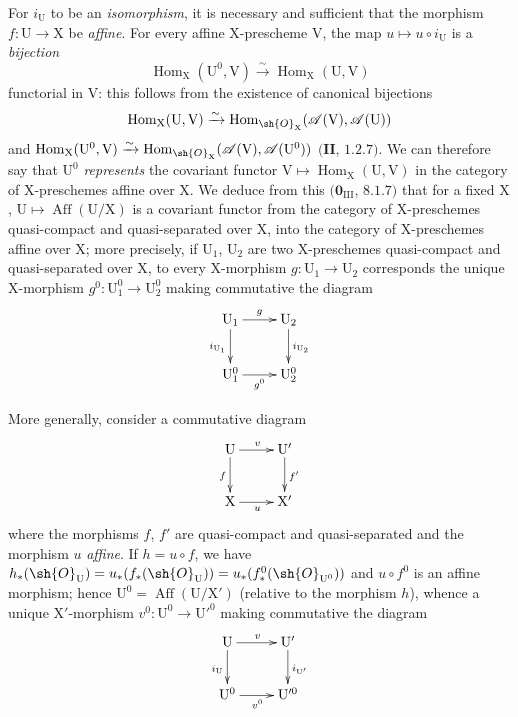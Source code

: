 \begin{env}[21.12.1]
For $i_{\mathrm{U}}$ to be an \emph{isomorphism}, it is necessary and sufficient that the morphism $f:\mathrm{U}\to\mathrm{X}$ be \emph{affine}.
For every affine $\mathrm{X}$-prescheme $\mathrm{V}$, the map $u\mapsto u\circ i_{\mathrm{U}}$ is a \emph{bijection}
\[
  \operatorname{Hom}_{\mathrm{X}}(\mathrm{U}^0,\mathrm{V})\xrightarrow{\sim}\operatorname{Hom}_{\mathrm{X}}(\mathrm{U},\mathrm{V})
\]
functorial in $\mathrm{V}$: this follows from the existence of canonical bijections
\[
  \operatorname{Hom}_{\mathrm{X}}(\mathrm{U},\mathrm{V})\xrightarrow{\sim}\operatorname{Hom}_{\sh{O}_{\mathrm{X}}}(\mathscr{A}(\mathrm{V}),\mathscr{A}(\mathrm{U}))
\]
and $\operatorname{Hom}_{\mathrm{X}}(\mathrm{U}^0,\mathrm{V})\xrightarrow{\sim}\operatorname{Hom}_{\sh{O}_{\mathrm{X}}}(\mathscr{A}(\mathrm{V}),\mathscr{A}(\mathrm{U}^0))$ $(\mathbf{II}$, $1.2.7)$.
We can therefore say that $\mathrm{U}^0$ \emph{represents} the covariant functor $\mathrm{V}\mapsto\operatorname{Hom}_{\mathrm{X}}(\mathrm{U},\mathrm{V})$ in the category of X-preschemes affine over $\mathrm{X}$.
We deduce from this $(\mathbf{0}_{\mathrm{III}}$, $8.1.7)$ that for a fixed $\mathrm{X}$, $\mathrm{U}\mapsto\operatorname{Aff}(\mathrm{U}/\mathrm{X})$ is a covariant functor from the category of $\mathrm{X}$-preschemes quasi-compact and quasi-separated over $\mathrm{X}$, into the category of $\mathrm{X}$-preschemes affine over $\mathrm{X}$; more precisely, if $\mathrm{U}_1$, $\mathrm{U}_2$ are two $\mathrm{X}$-preschemes quasi-compact and quasi-separated over $\mathrm{X}$, to every $\mathrm{X}$-morphism $g:\mathrm{U}_1\to\mathrm{U}_2$ corresponds the unique $\mathrm{X}$-morphism $g^0:\mathrm{U}_1^0\to\mathrm{U}_2^0$ making commutative the diagram
\[
  \xymatrix{
    \mathrm{U}_1 \ar[r]^g \ar[d]_{i_{\mathrm{U}_1}} & \mathrm{U}_2 \ar[d]^{i_{\mathrm{U}_2}} \\
    \mathrm{U}_1^0 \ar[r]_{g^0} & \mathrm{U}_2^0
  }
\]
\end{env}

More generally, consider a commutative diagram
\[
  \xymatrix{
    \mathrm{U} \ar[r]^v \ar[d]_f & \mathrm{U}' \ar[d]^{f'} \\
    \mathrm{X} \ar[r]_u & \mathrm{X}'
  }
\]
where the morphisms $f$, $f'$ are quasi-compact and quasi-separated and the morphism $u$ \emph{affine}.
If $h=u\circ f$, we have $h_*(\sh{O}_{\mathrm{U}})=u_*(f_*(\sh{O}_{\mathrm{U}}))=u_*(f_*^{0}(\sh{O}_{\mathrm{U}^0}))$ and $u\circ f^0$ is an affine morphism; hence $\mathrm{U}^0=\operatorname{Aff}(\mathrm{U}/\mathrm{X}')$ (relative to the morphism $h$), whence a unique $\mathrm{X}'$-morphism $v^0:\mathrm{U}^0\to\mathrm{U}'^0$ making commutative the diagram
\[
  \xymatrix{
    \mathrm{U} \ar[r]^v \ar[d]_{i_{\mathrm{U}}} & \mathrm{U}' \ar[d]^{i_{\mathrm{U}'}} \\
    \mathrm{U}^0 \ar[r]_{v^0} & \mathrm{U}'^0
  }
\]


